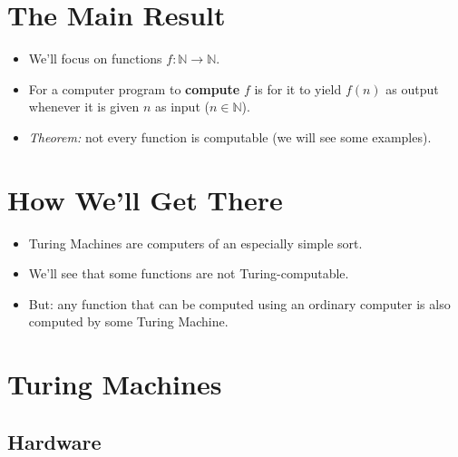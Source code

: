 \documentclass[12pt]{extarticle}
\begin{document}





\section{The Main Result}

\begin{itemize}

\item We'll focus on functions $f: \mathbb{N} \rightarrow \mathbb{N}$.

\item For a computer program to \textbf{compute} $f$ is for it to yield $f(n)$ as output whenever it is given $n$ as input ($n \in \mathbb{N}$). 

\item \emph{Theorem:} not every function is computable (we will see some examples).



\end{itemize}



\section{How We'll Get There}

\begin{itemize}

\item Turing Machines are computers of an especially simple sort.

\item We'll see that some functions are not Turing-computable.

\item But: any function that can be computed using an ordinary computer is also computed by some Turing Machine. 

\end{itemize}







\section{Turing Machines}




\subsection*{Hardware}
\end{document}
